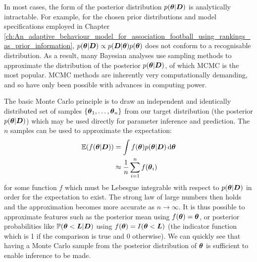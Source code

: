 
In most cases, the form of the posterior distribution \(p(\boldsymbol{\theta} | \boldsymbol{D})\) is analytically intractable. For
example, for the chosen prior distributions and model specifications employed in Chapter
\ref{ch:An_adaptive_behaviour_model_for_association_football_using_rankings_as_prior_information}, \(p(\boldsymbol{\theta} |
\boldsymbol{D}) \propto p(\boldsymbol{D} | \boldsymbol{\theta}) p(\boldsymbol{\theta})\) does not conform to a recognisable distribution. As a result, many
Bayesian analyses use sampling methods to approximate the distribution of the posterior \(p(\boldsymbol{\theta} | \boldsymbol{D})\), of
which \gls{MCMC} is the most popular. \gls{MCMC} methods are inherently very computationally demanding, and so have only
been possible with advances in computing power.

The basic Monte Carlo principle is to draw an independent and identically distributed set of samples \(\{\boldsymbol{\theta}_1,
\ldots, \boldsymbol{\theta}_n\}\) from our target distribution (the posterior \(p(\boldsymbol{\theta} | \boldsymbol{D})\)) which may be used
directly for parameter inference and prediction. The \(n\) samples can be used to approximate the expectation:
\begin{align}
\mathbb{E}(f(\boldsymbol{\theta} | \boldsymbol{D})) 
&= \int f(\boldsymbol{\theta}) p(\boldsymbol{\theta} | \boldsymbol{D})\, \mathrm{d}\boldsymbol{\theta} \notag\\
&\approx \frac{1}{n} \sum_{i=1}^{n} f(\boldsymbol{\theta}_i)
\label{eq:MCapprox}
\end{align}
for some function \(f\) which must be Lebesgue integrable with respect to \(p(\boldsymbol{\theta} | \boldsymbol{D})\) in order for the
expectation to exist. The strong law of large numbers then holds and the approximation becomes more accurate as \(n
\rightarrow \infty\). It is thus possible to approximate features such as the posterior mean using \(f(\boldsymbol{\theta}) =
\boldsymbol{\theta}\), or posterior probabilities like \(\mathbb{P}(\boldsymbol{\theta} < \boldsymbol{L} | \boldsymbol{D})\) using \(f(\boldsymbol{\theta}) =
I(\boldsymbol{\theta} < \boldsymbol{L})\) (the indicator function which is 1 if the comparison is true and 0 otherwise). We can
quickly see that having a Monte Carlo sample from the posterior distribution of \(\boldsymbol{\theta}\) is sufficient to enable
inference to be made.


